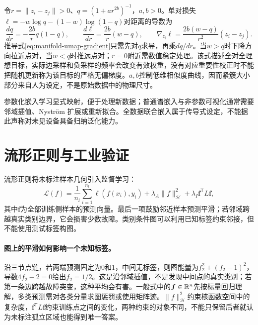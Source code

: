 令$r=\|z_i-z_j\|>0$、$q=(1+ar^{2b})^{-1}$，$a,b>0$。单对损失$\ell=-w\log q-(1-w)\log(1-q)$对距离的导数为
\begin{equation}
 \frac{dq}{dr}=-\frac{2b}{r}q(1-q),\qquad
 \frac{d\ell}{dr}=\frac{2b}{r}(w-q),\qquad
 \nabla_{z_i}\ell=\frac{2b(w-q)}{r^2}(z_i-z_j).\label{eq:manifold-umap-gradient}
\end{equation}
推导式\eqref{eq:manifold-umap-gradient}只需先对$q$求导，再乘$dq/dr$。当$w>q$时下降方向拉近点对，当$w<q$时推远点对；$r=0$附近需数值稳定处理。该式描述全对全理想目标，实际边采样和负采样的频率会改变有效权重，没有对应重要性校正时不能把随机更新称为该目标的严格无偏梯度。$a,b$控制低维相似度曲线，因而紧簇大小部分来自人为设定，不是原始数据中的物理尺寸。

参数化嵌入学习显式映射，便于处理新数据；普通谱嵌入与非参数可视化通常需要邻域插值、Nystr\"om 扩展或重新拟合。全数据联合嵌入属于传导式设定，不能据此声称对未见设备具备归纳泛化能力。

\section{流形正则与工业验证}
流形正则将未标注样本几何引入监督学习\cite{belkin2006regularization}：
\begin{equation}
 \mathcal L(f)=\frac1{n_l}\sum_{i=1}^{n_l}\ell(f(x_i),y_i)
 +\lambda_A\|f\|_{\mathcal H}^2+\lambda_I\bm f^{\mathsf T}L\bm f,
\end{equation}
其中$\bm f$为全部训练侧样本的预测向量。最后一项鼓励邻近样本预测平滑；若邻域跨越真实类别边界，它会损害少数故障。类别条件图可以利用已知标签约束邻接，但不能使用测试标签构图。

\paragraph{图上的平滑如何影响一个未知标签。}
沿三节点链，若两端预测固定为$0$和$1$，中间无标签，则图能量为$f_2^2+(f_2-1)^2$，导数$4f_2-2=0$给出$f_2=1/2$。这是沿邻域插值，不是发现中间点的真实类别；若第一条边跨越故障突变，这种平均会有害。一般式中的$\bm f\in\mathbb{R}^n$先按标量回归理解，多类预测需对各类分量求图惩罚或使用矩阵迹。$\|f\|_{\mathcal H}^2$约束核函数空间中的复杂度，$\bm f^{\mathsf T}L\bm f$约束训练点之间的变化，两种约束的对象不同，不能只保留后者就认为未标注孤立区域也能得到唯一答案。

